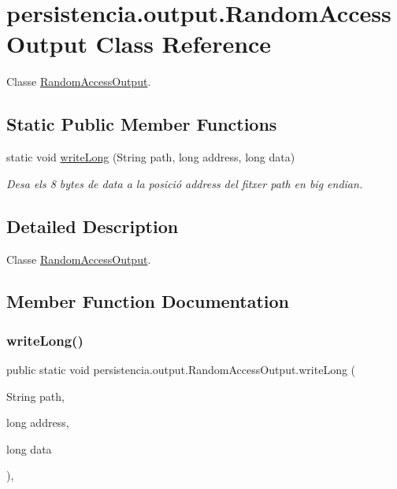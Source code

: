 \hypertarget{classpersistencia_1_1output_1_1RandomAccessOutput}{}\section{persistencia.\+output.\+Random\+Access\+Output Class Reference}
\label{classpersistencia_1_1output_1_1RandomAccessOutput}


Classe \hyperlink{classpersistencia_1_1output_1_1RandomAccessOutput}{Random\+Access\+Output}.  


\subsection*{Static Public Member Functions}
\begin{DoxyCompactItemize}
\item 
static void \hyperlink{classpersistencia_1_1output_1_1RandomAccessOutput_a204709eb802b6f934007c786a95ebe3f}{write\+Long} (String path, long address, long data)
\begin{DoxyCompactList}\small\item\em Desa els 8 bytes de data a la posició address del fitxer path en big endian. \end{DoxyCompactList}\end{DoxyCompactItemize}


\subsection{Detailed Description}
Classe \hyperlink{classpersistencia_1_1output_1_1RandomAccessOutput}{Random\+Access\+Output}. 

\subsection{Member Function Documentation}
\mbox{\label{classpersistencia_1_1output_1_1RandomAccessOutput_a204709eb802b6f934007c786a95ebe3f}} 
\subsubsection{\texorpdfstring{write\+Long()}{writeLong()}}
{\footnotesize\ttfamily public static void persistencia.\+output.\+Random\+Access\+Output.\+write\+Long (\begin{DoxyParamCaption}\item[{String}]{path,  }\item[{long}]{address,  }\item[{long}]{data }\end{DoxyParamCaption})\hspace{0.3cm}{\ttfamily [inline]}, {\ttfamily [static]}}




